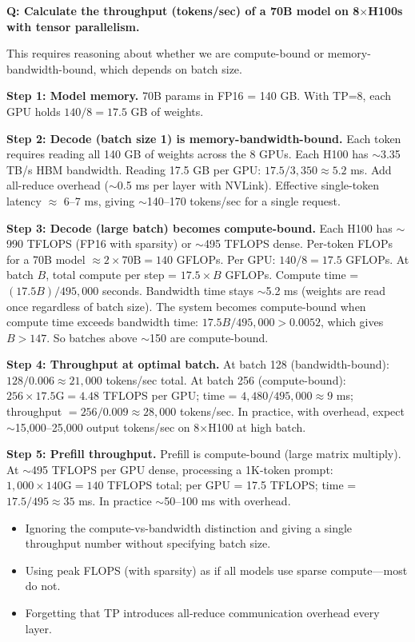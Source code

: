 \begin{interviewq}
\textbf{Q: Calculate the throughput (tokens/sec) of a 70B model on 8$\times$H100s with tensor parallelism.}

 \quad {} \quad \badgefreq{\freqmed}

\stronganswer

This requires reasoning about whether we are compute-bound or memory-bandwidth-bound, which depends on batch size.

\textbf{Step 1: Model memory.} 70B params in FP16 = 140 GB. With TP=8, each GPU holds $140/8 = 17.5$ GB of weights.

\textbf{Step 2: Decode (batch size 1) is memory-bandwidth-bound.} Each token requires reading all 140 GB of weights across the 8 GPUs. Each H100 has $\sim$3.35 TB/s HBM bandwidth. Reading 17.5 GB per GPU: $17.5 / 3{,}350 \approx 5.2$ ms. Add all-reduce overhead ($\sim$0.5 ms per layer with NVLink). Effective single-token latency $\approx$ 6--7 ms, giving $\sim$140--170 tokens/sec for a single request.

\textbf{Step 3: Decode (large batch) becomes compute-bound.} Each H100 has $\sim$990 TFLOPS (FP16 with sparsity) or $\sim$495 TFLOPS dense. Per-token FLOPs for a 70B model $\approx 2 \times 70\text{B} = 140$ GFLOPs. Per GPU: $140 / 8 = 17.5$ GFLOPs. At batch $B$, total compute per step = $17.5 \times B$ GFLOPs. Compute time = $(17.5B) / 495{,}000$ seconds. Bandwidth time stays $\sim$5.2 ms (weights are read once regardless of batch size). The system becomes compute-bound when compute time exceeds bandwidth time: $17.5B / 495{,}000 > 0.0052$, which gives $B > 147$. So batches above $\sim$150 are compute-bound.

\textbf{Step 4: Throughput at optimal batch.} At batch 128 (bandwidth-bound): $128 / 0.006 \approx 21{,}000$ tokens/sec total. At batch 256 (compute-bound): $256 \times 17.5\text{G} = 4.48$ TFLOPS per GPU; time = $4{,}480 / 495{,}000 \approx 9$ ms; throughput $= 256 / 0.009 \approx 28{,}000$ tokens/sec. In practice, with overhead, expect $\sim$15{,}000--25{,}000 output tokens/sec on 8$\times$H100 at high batch.

\textbf{Step 5: Prefill throughput.} Prefill is compute-bound (large matrix multiply). At $\sim$495 TFLOPS per GPU dense, processing a 1K-token prompt: $1{,}000 \times 140\text{G} = 140$ TFLOPS total; per GPU = 17.5 TFLOPS; time = $17.5 / 495 \approx 35$ ms. In practice $\sim$50--100 ms with overhead.

\redflags
\begin{itemize}
    \item Ignoring the compute-vs-bandwidth distinction and giving a single throughput number without specifying batch size.
    \item Using peak FLOPS (with sparsity) as if all models use sparse compute---most do not.
    \item Forgetting that TP introduces all-reduce communication overhead every layer.
\end{itemize}


\end{interviewq}
